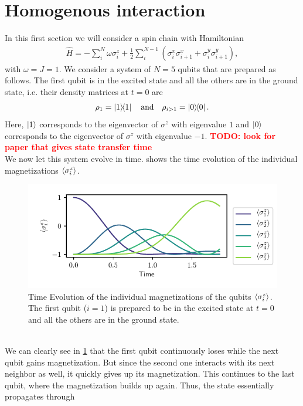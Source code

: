 \documentclass{book}
\numberwithin{equation}{section} %
\begin{document}
\section{Homogenous interaction}
In this first section we will consider a spin chain with Hamiltonian
\begin{align}
    \hat{H} = -\sum\limits_i^N \omega\sigma^z_i + \frac{1}{2} \sum\limits_i^{N-1} (\sigma^x_i\sigma^x_{i+1}+\sigma^y_i\sigma^y_{i+1}),
\end{align}
with $\omega=J=1$.
We consider a system of $N=5$ qubits that are prepared as follows.
The first qubit is in the excited state and all the others are in the ground state,
i.e. their density matrices at $t=0$ are
\begin{align}
    \rho_1 = \dyad{1} \qq{and} \rho_{i>1} = \dyad{0}.
\end{align}
Here, $\ket{1}$ corresponds to the eigenvector of $\sigma^z$ with eigenvalue $1$ and 
$\ket{0}$ corresponds to the eigenvector of $\sigma^z$ with eigenvalue $-1$.
\textcolor{red}{\textbf{TODO: look for paper that gives state transfer time}}\\
We now let this system evolve in time.
 shows the time evolution of the individual magnetizations $\expval{\sigma^z_i}$.
\begin{figure}[h!]
    \centering
    \includegraphics{alltheplots/j_const/expval_z.pdf}
    \caption{Time Evolution of the individual magnetizations of the qubits
    $\expval{\sigma^z_i}$.
    The first qubit ($i=1$) is prepared to be in the excited state at $t=0$ and all the others
    are in the ground state.}
    \label{fig:hom_magn}
\end{figure}\\
We can clearly see in \cref{fig:hom_magn} that the first qubit continuously loses while the next qubit gains magnetization.
But since the second one interacts with its next neighbor as well, it quickly gives up its magnetization.
This continues to the last qubit, where the magnetization builds up again. Thus, the state essentially propagates through
\end{document}
